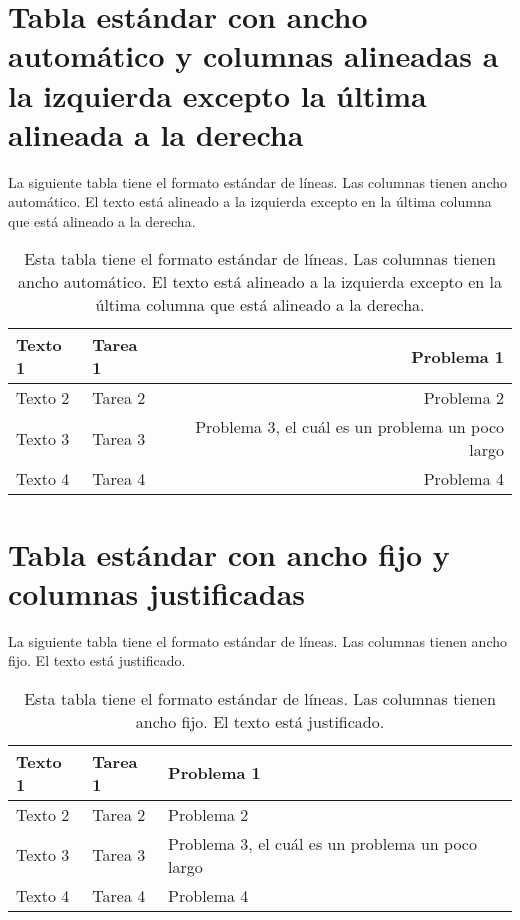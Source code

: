 \section*{Tabla estándar con ancho automático y columnas alineadas a la izquierda excepto la última alineada a la derecha}

La siguiente tabla tiene el formato estándar de líneas. Las columnas tienen ancho automático. El texto está alineado a la izquierda excepto en la última columna que está alineado a la derecha.

\begin{table}[h]
	\centering
	\begin{tabular}{|l|l|r|}
		\hline
		Texto 1 & Tarea 1 & Problema 1 \\
		\hline
		Texto 2 & Tarea 2 & Problema 2 \\
		\hline
		Texto 3 & Tarea 3 & Problema 3, el cuál es un problema un poco largo \\
		\hline
		Texto 4 & Tarea 4 & Problema 4 \\
		\hline
	\end{tabular}
	\caption[Tabla estándar con ancho automático y columnas alineadas a la izquierda excepto la última alineada a la derecha]{Esta tabla tiene el formato estándar de líneas. Las columnas tienen ancho automático. El texto está alineado a la izquierda excepto en la última columna que está alineado a la derecha.}
	\label{table3}
\end{table}

\section*{Tabla estándar con ancho fijo y columnas justificadas}

La siguiente tabla tiene el formato estándar de líneas. Las columnas tienen ancho fijo. El texto está justificado.

\begin{table}[h]
	\centering
	\begin{tabular}{|p{2cm}|p{2.5cm}|p{5cm}|}
		\hline
		Texto 1 & Tarea 1 & Problema 1 \\
		\hline
		Texto 2 & Tarea 2 & Problema 2 \\
		\hline
		Texto 3 & Tarea 3 & Problema 3, el cuál es un problema un poco largo \\
		\hline
		Texto 4 & Tarea 4 & Problema 4 \\
		\hline
	\end{tabular}
	\caption[Tabla estándar con ancho fijo y columnas justificadas]{Esta tabla tiene el formato estándar de líneas. Las columnas tienen ancho fijo. El texto está justificado.}
	\label{table4}
\end{table}

